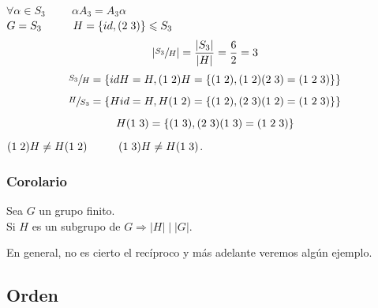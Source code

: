 \documentclass[11pt,a4paper]{article}
\begin{document}
$\forall \alpha \in S_{3} \hspace{1cm} \alpha A_{3} = A_{3} \alpha$ \\
$G = S_{3} \hspace{1cm} H = \{id, (2 \hspace{0.1cm} 3)\} \leqslant S_{3}$
$$|\sfrac{S_{3}}{H}| = \frac{|S_{3}|}{|H|} = \frac{6}{2} = 3$$
$$\sfrac{S_{3}}{H} = \{idH = H, (1 \hspace{0.1cm} 2)H = \{(1 \hspace{0.1cm} 2), (1 \hspace{0.1cm} 2)(2 \hspace{0.1cm} 3) = (1 \hspace{0.1cm} 2 \hspace{0.1cm} 3) \} \}$$
$$\sfrac{H}{S_{3}} = \{Hid = H, H(1 \hspace{0.1cm} 2) = \{(1 \hspace{0.1cm} 2), (2 \hspace{0.1cm} 3)(1 \hspace{0.1cm} 2) = (1 \hspace{0.1cm} 2 \hspace{0.1cm} 3) \} \}$$
$$H (1 \hspace{0.1cm} 3) = \{(1\hspace{0.1cm} 3), (2 \hspace{0.1cm} 3)(1 \hspace{0.1cm} 3) = (1 \hspace{0.1cm} 2 \hspace{0.1cm} 3)\}$$
$(1 \hspace{0.1cm} 2)H \neq H(1 \hspace{0.1cm} 2) \hspace{1cm} (1 \hspace{0.1cm} 3)H \neq H(1 \hspace{0.1cm} 3)$.

\subsubsection*{Corolario}

Sea $G$ un grupo finito. \\
Si $H$ es un subgrupo de $G \Rightarrow |H| \mid |G|$.

En general, no es cierto el recíproco y más adelante veremos algún ejemplo.

\subsection{Orden}
\end{document}
